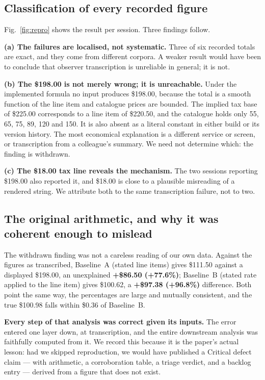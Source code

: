 \documentclass[conference]{IEEEtran}
\begin{document}
\subsection{Classification of every recorded figure}

Fig.~\ref{fig:repro} shows the result per session. Three findings follow.

\textbf{(a) The failures are localised, not systematic.} Three of six recorded totals are exact, and
they come from different corpora. A weaker result would have been to conclude that observer
transcription is unreliable in general; it is not.

\textbf{(b) The \$198.00 is not merely wrong; it is unreachable.} Under the implemented formula no
input produces \$198.00, because the total is a smooth function of the line item and catalogue prices
are bounded. The implied tax base of \$225.00 corresponds to a line item of \$220.50, and the catalogue
holds only 55, 65, 75, 89, 120 and 150. It is also absent as a literal constant in either build or its
version history. The most economical explanation is a different service or screen, or transcription
from a colleague's summary. We need not determine which: the finding is withdrawn.

\textbf{(c) The \$18.00 tax line reveals the mechanism.} The two sessions reporting \$198.00 also
reported it, and \$18.00 is close to a plausible misreading of a rendered string. We attribute both to
the same transcription failure, not to two.

\subsection{The original arithmetic, and why it was coherent enough to mislead}

The withdrawn finding was not a careless reading of our own data. Against the figures as transcribed,
Baseline~A (stated line items) gives \$111.50 against a displayed \$198.00, an unexplained
\textbf{+\$86.50 (+77.6\%)}; Baseline~B (stated rate applied to the line item) gives \$100.62, a
\textbf{+\$97.38 (+96.8\%)} difference. Both point the same way, the percentages are large and mutually
consistent, and the true \$100.98 falls within \$0.36 of Baseline~B.

\textbf{Every step of that analysis was correct given its inputs.} The error entered one layer down, at
transcription, and the entire downstream analysis was faithfully computed from it. We record this
because it is the paper's actual lesson: had we skipped reproduction, we would have published a
Critical defect claim --- with arithmetic, a corroboration table, a triage verdict, and a backlog
entry --- derived from a figure that does not exist.
\end{document}
